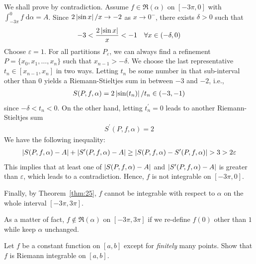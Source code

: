 \documentclass[thmcnt=section, 12pt]{my-elegantbook}
\begin{document}
\begin{example}
    We shall prove by contradiction. Assume $f \in \mathfrak{R}(\alpha)$ on $[-3\pi, 0]$ with $\int_{-3\pi}^{0} f \; \mathrm{d}\alpha = A$. Since $2\left\lvert \sin x \right\rvert / x \to -2$ as $x \to 0^{-}$, there exists $\delta > 0$ such that 
    \begin{align*}
        -3 < \frac{2\left\lvert \sin x \right\rvert}{x} < -1
        \quad \forall x \in (-\delta, 0)
    \end{align*}
    Choose $\varepsilon = 1$. For all partitions $P_\varepsilon$, we can always find a refinement $P=\{x_0, x_1, \ldots, x_n\}$ such that $x_{n-1} > -\delta$. We choose the last representative $t_n \in [x_{n-1}, x_n]$ in two ways. Letting $t_n$ be some number in that sub-interval other than $0$ yields a Riemann-Stieltjes sum in between $-3$ and $-2$, i.e., 
    \begin{align*}
        S(P,f,\alpha) = 2 \left\lvert \sin(t_n) \right\rvert / t_n \in (-3, -1)
    \end{align*}
    since $-\delta < t_n < 0$. On the other hand, letting $t^\prime_n = 0$ leads to another Riemann-Stieltjes sum
    \begin{align*}
        S^\prime(P,f,\alpha) = 2
    \end{align*}
    We have the following inequality:
    \begin{align*}
        \left\lvert S(P,f,\alpha) - A \right\rvert + \left\lvert S^\prime(P,f,\alpha) - A \right\rvert 
        \geq \left\lvert S(P,f,\alpha) - S^\prime(P,f,\alpha) \right\rvert
        > 3 > 2\varepsilon
    \end{align*}
    This implies that at least one of $\left\lvert S(P,f,\alpha) - A \right\rvert $ and $ \left\lvert S^\prime(P,f,\alpha) - A \right\rvert $ is greater than $\varepsilon$, which leads to a contradiction. Hence, $f$ is not integrable on $[-3\pi, 0]$.
    
    Finally, by Theorem~\ref{thm:25}, $f$ cannot be integrable with respect to $\alpha$ on the whole interval $[-3\pi, 3\pi]$.

    As a matter of fact, $f \notin \mathfrak{R}(\alpha)$ on $[-3\pi, 3\pi]$ if we re-define $f(0)$ other than $1$ while keep $\alpha$ unchanged.
    \label{eg:4}
\end{example}

\begin{exercise}
    Let $f$ be a constant function on $[a, b]$ except for \textit{finitely} many points. Show that $f$ is Riemann integrable on $[a, b]$.

\end{exercise}
\end{document}
